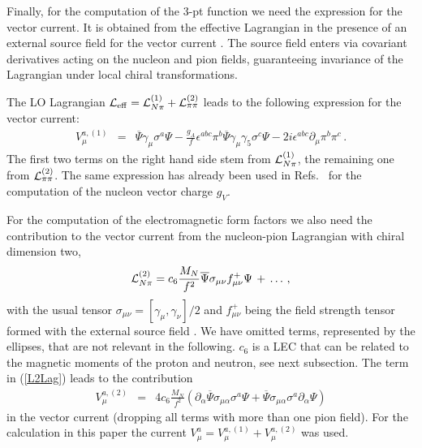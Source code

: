 \documentclass[11pt,prd,aps,showpacs,eqsecnum,floatfix,nofootinbib,preprint,tightenlines]{revtex4}
\newcommand{\pref}[1]{(\ref{#1})}
\begin{document}
\begin{appendix}
Finally, for the computation of the 3-pt function we need the expression for the vector current.
It is obtained from the effective Lagrangian in the presence of an external source field for the vector current \cite{Gasser:1987rb}. The source field enters via covariant derivatives acting on the nucleon and pion fields, guaranteeing invariance of the Lagrangian under local chiral transformations.

The LO Lagrangian ${\cal L}_{\rm eff}={\cal L}_{N\pi}^{(1)} + {\cal L}_{\pi\pi}^{(2)}$ leads to the following expression for the vector current:
\begin{eqnarray}
V_{\mu}^{a,(1)} & = & \overline{\Psi}\gamma_{\mu} \sigma^a\Psi -\frac{g_A}{f}\epsilon^{abc} \pi^b \overline{\Psi}\gamma_{\mu}\gamma_5\sigma^c\Psi - 2i \epsilon^{abc}\partial_{\mu} \pi^b \pi^c\,.\label{DefVectorCurrent}
\end{eqnarray}
The first two terms on the right hand side stem from ${\cal L}_{N\pi}^{(1)}$, the remaining one from ${\cal L}_{\pi\pi}^{(2)}$. The same expression has already been used in Refs.\ \cite{Bar:2016uoj} for the computation of the nucleon vector charge $g_V$. 

For the computation of the electromagnetic form factors we also need the contribution to the vector current from the nucleon-pion Lagrangian with chiral dimension two,
\begin{equation}\label{L2Lag}
{\cal L}^{(2)}_{N\pi}=c_6\frac{M_N}{f^2} \overline{\Psi}\sigma_{\mu\nu}f^+_{\mu\nu}\Psi\,  +\,\ldots \,,
\end{equation}
with the usual tensor $\sigma_{\mu\nu} = [\gamma_{\mu},\gamma_{\nu}]/2$ and $f^+_{\mu\nu}$ being the field strength tensor formed with the external source field \cite{Gasser:1987rb}. We have omitted terms, represented by the ellipses, that are not relevant in the following. $c_6$ is a LEC that can be related to the magnetic moments of the proton and neutron, see next subsection. The term in \pref{L2Lag} leads to the contribution 
\begin{eqnarray}
V_{\mu}^{a,(2)} & = & 4 c_6\frac{M_N}{f^2} \left(\partial_{\alpha}\overline{\Psi} \sigma_{\mu\alpha}\sigma^a\Psi+\overline{\Psi} \sigma_{\mu\alpha}\sigma^a\partial_{\alpha}\Psi \right)\label{DefVectorCurrent2}
\end{eqnarray}
in the vector current (dropping all terms with more than one pion field). For the calculation in this paper the current $V_{\mu}^a=V_{\mu}^{a,(1)}+V_{\mu}^{a,(2)}$ was used.


\end{appendix}
\end{document}
